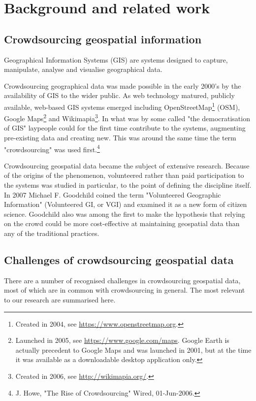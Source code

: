 \section{Background and related work}

\subsection{Crowdsourcing geospatial information}

Geographical Information Systems (GIS) are systems designed to capture, manipulate, analyse and visualise geographical data. 

Crowdsourcing geographical data was made possible in the early 2000's by the availability of GIS to the wider public. As web technology matured, publicly available, web-based GIS systems emerged including OpenStreetMap\footnote{Created in 2004, see \url{https://www.openstreetmap.org}.} (OSM), Google Maps\footnote{Launched in 2005, see \url{https://www.google.com/maps}. Google Earth is actually precedent to Google Maps and was launched in 2001, but at the time it was available as a downloadable desktop application only.} and Wikimapia\footnote{Created in 2006, see \url{http://wikimapia.org/}.}. In what was by some called "the democratisation of GIS" \cite{Butler:2006fe} laypeople could for the first time contribute to the systems, augmenting pre-existing data and creating new. This was around the same time the term "crowdsourcing" was used first.\footnote{J. Howe, "The Rise of Crowdsourcing" Wired, 01-Jun-2006.}

Crowdsourcing geospatial data became the subject of extensive research. Because of the origins of the phenomenon, volunteered rather than paid participation to the systems was studied in particular, to the point of defining the discipline itself. In 2007 Michael F. Goodchild coined the term "Volunteered Geographic Information" (Volunteered GI, or VGI) \cite{Goodchild:2007vt} and examined it as a new form of citizen science. Goodchild also was among the first to make the hypothesis that relying on the crowd could be more cost-effective at maintaining geospatial data than any of the traditional practices.

\subsection{Challenges of crowdsourcing geospatial data}
\label{challenges-of-crowdsourcing-geospatial-data}

There are a number of recognised challenges in crowdsourcing geospatial data, most of which are in common with crowdsourcing in general. The most relevant to our research are summarised here.

